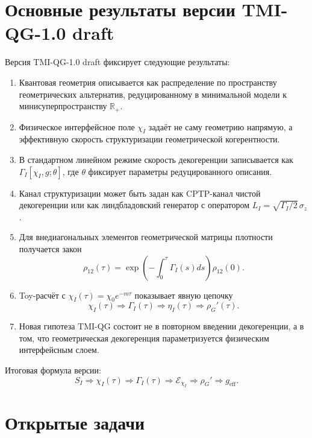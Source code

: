 \documentclass[12pt,a4paper]{article}
\newcommand{\Eff}{\mathrm{eff}}
\begin{document}
\section{Основные результаты версии TMI-QG-1.0 draft}

Версия TMI-QG-1.0 draft фиксирует следующие результаты:
\begin{enumerate}[leftmargin=2em]
    \item Квантовая геометрия описывается как распределение по пространству геометрических альтернатив, редуцированному в минимальной модели к минисуперпространству $\mathbb R_+$.
    \item Физическое интерфейсное поле $\chi_I$ задаёт не саму геометрию напрямую, а эффективную скорость структуризации геометрической когерентности.
    \item В стандартном линейном режиме скорость декогеренции записывается как $\Gamma_I[\chi_I,g;\theta]$, где $\theta$ фиксирует параметры редуцированного описания.
    \item Канал структуризации может быть задан как CPTP-канал чистой декогеренции или как линдбладовский генератор с оператором $L_I=\sqrt{\Gamma_I/2}\,\sigma_z$.
    \item Для внедиагональных элементов геометрической матрицы плотности получается закон
    \[
    \rho_{12}(\tau)
    =
    \exp\left(-\int_0^\tau\Gamma_I(s)ds\right)\rho_{12}(0).
    \]
    \item Toy-расчёт с $\chi_I(\tau)=\chi_0e^{-m\tau}$ показывает явную цепочку
    \[
    \chi_I(\tau)
    \Rightarrow
    \Gamma_I(\tau)
    \Rightarrow
    \eta_I(\tau)
    \Rightarrow
    \rho_G'(\tau).
    \]
    \item Новая гипотеза TMI-QG состоит не в повторном введении декогеренции, а в том, что геометрическая декогеренция параметризуется физическим интерфейсным слоем.
\end{enumerate}

Итоговая формула версии:
\[
\boxed{
S_I
\Rightarrow
\chi_I(\tau)
\Rightarrow
\Gamma_I(\tau)
\Rightarrow
\mathcal E_{\chi_I}
\Rightarrow
\rho_G'
\Rightarrow
 g_{\Eff}.
}
\]

\section{Открытые задачи}
\end{document}
